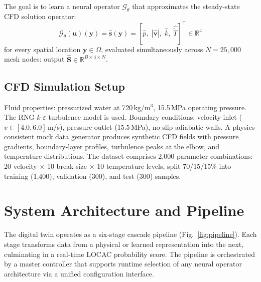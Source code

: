 \documentclass[conference]{IEEEtran}
\begin{document}
The goal is to learn a neural operator $\mathcal{G}_\theta$ that approximates the steady-state CFD solution operator:
\begin{equation}
\mathcal{G}_\theta(\bm{u})(\bm{y}) = \hat{\bm{s}}(\bm{y}) = [\hat{p},\; |\hat{\bm{v}}|,\; \hat{k},\; \hat{\tilde{T}}]^\top \in \mathbb{R}^4
\label{eq:operator}
\end{equation}
for every spatial location $\bm{y} \in \Omega$, evaluated simultaneously across $N = 25{,}000$ mesh nodes: output $\hat{\bm{S}} \in \mathbb{R}^{B \times 4 \times N}$.

\subsection{CFD Simulation Setup}

Fluid properties: pressurized water at 720\,kg/m$^3$, 15.5\,MPa operating pressure. The RNG $k$-$\varepsilon$ turbulence model is used. Boundary conditions: velocity-inlet ($v \in [4.0, 6.0]$\,m/s), pressure-outlet (15.5\,MPa), no-slip adiabatic walls. A physics-consistent mock data generator produces synthetic CFD fields with pressure gradients, boundary-layer profiles, turbulence peaks at the elbow, and temperature distributions. The dataset comprises 2,000 parameter combinations: 20 velocity $\times$ 10 break size $\times$ 10 temperature levels, split 70/15/15\% into training (1,400), validation (300), and test (300) samples.

\section{System Architecture and Pipeline}
\label{sec:system}

The digital twin operates as a six-stage cascade pipeline (Fig.~\ref{fig:pipeline}). Each stage transforms data from a physical or learned representation into the next, culminating in a real-time LOCAC probability score. The pipeline is orchestrated by a master controller that supports runtime selection of any neural operator architecture via a unified configuration interface.
\end{document}
